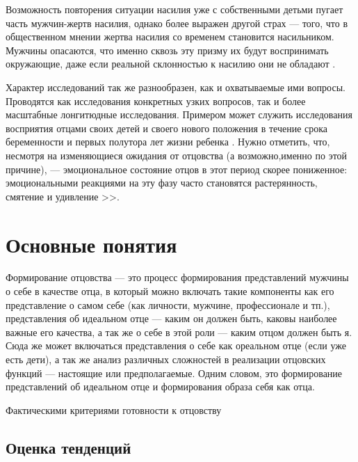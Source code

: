 \documentclass{../../common/thesisbyxetex}
\begin{document}
Возможность повторения ситуации насилия уже с собственными детьми пугает часть мужчин-жертв 
насилия, однако более выражен другой страх --- того, что в общественном мнении жертва насилия 
со временем становится насильником. Мужчины опасаются, что именно сквозь эту призму их будут 
воспринимать окружающие, даже если реальной склонностью к насилию они не обладают \cite{sex}. 

Характер исследований так же разнообразен, как и охватываемые ими вопросы. Проводятся как 
исследования конкретных узких вопросов, так и более масштабные лонгитюдные исследования. Примером 
может служить исследования восприятия отцами своих детей и своего нового положения в течение срока 
беременности и первых полутора лет жизни ребенка \cite{percep}. Нужно отметить, что, несмотря на 
изменяющиеся ожидания от отцовства (а возможно,именно по этой причине), --- эмоциональное состояние 
отцов в этот период скорее пониженное: эмоциональными реакциями на эту фазу часто 
становятся растерянность, смятение и удивление \cite[12]{meta}>>.

\section{Основные понятия}

Формирование отцовства --- это процесс формирования представлений мужчины о себе в качестве отца, в 
который можно включать такие компоненты как его представление о самом себе (как личности, мужчине, 
профессионале и тп.), представления об идеальном отце --- каким он должен быть, каковы наиболее 
важные его качества, а так же о себе в этой роли --- каким отцом должен быть я. Сюда же может 
включаться представления о себе как ореальном отце (если уже есть дети), а так же анализ различных 
сложностей в реализации отцовских функций --- настоящие или предполагаемые. 
Одним словом, это формирование представлений об идеальном отце и формирования образа себя как отца.

Фактическими критериями готовности  к отцовству


\subsection{Оценка тенденций}
\end{document}
